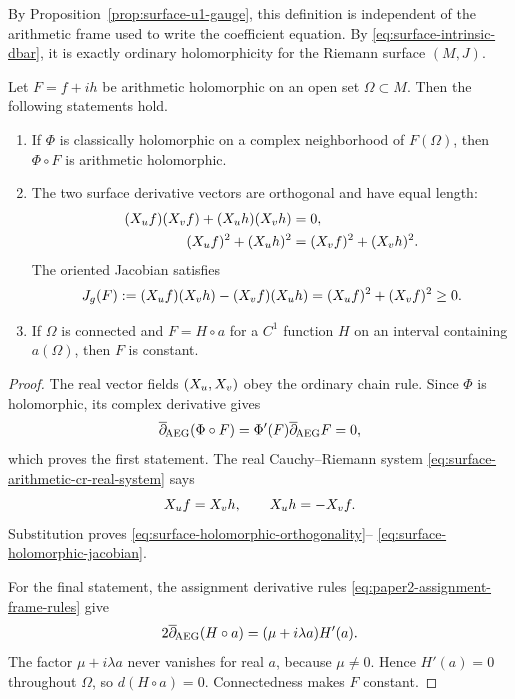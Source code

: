 By Proposition~\ref{prop:surface-u1-gauge}, this definition is independent of
the arithmetic frame used to write the coefficient equation.  By
\eqref{eq:surface-intrinsic-dbar}, it is exactly ordinary holomorphicity for the
Riemann surface $(M,J)$.

\begin{proposition}
\label{prop:surface-elementary-holomorphic-calculus}
Let $F=f+ih$ be arithmetic holomorphic on an open set $\Omega\subset M$.
Then the following statements hold.
\begin{enumerate}
 \item If $\Phi$ is classically holomorphic on a complex neighborhood of
 $F(\Omega)$, then $\Phi\circ F$ is arithmetic holomorphic.
 \item The two surface derivative vectors are orthogonal and have equal length:
 \begin{align}
  (X_u f)(X_v f)+(X_u h)(X_v h)&=0,
  \label{eq:surface-holomorphic-orthogonality}\\
  (X_u f)^2+(X_u h)^2
  &=(X_v f)^2+(X_v h)^2.
  \label{eq:surface-holomorphic-equal-length}
 \end{align}
 The oriented Jacobian satisfies
 \begin{equation}\label{eq:surface-holomorphic-jacobian}
  J_g(F)
  :=(X_u f)(X_v h)-(X_v f)(X_u h)
  =(X_u f)^2+(X_v f)^2\ge0.
 \end{equation}
 \item If $\Omega$ is connected and $F=H\circ a$ for a
 $C^1$ function $H$ on an interval containing $a(\Omega)$, then $F$
 is constant.
\end{enumerate}
\end{proposition}

\begin{proof}
The real vector fields $(X_u,X_v)$ obey the ordinary chain rule.  Since
$\Phi$ is holomorphic, its complex derivative gives
\[
 \overline\partial_{\!\mathrm{AEG}}(\Phi\circ F)
 =\Phi'(F)\overline\partial_{\!\mathrm{AEG}} F=0,
\]
which proves the first statement.  The real Cauchy--Riemann system
\eqref{eq:surface-arithmetic-cr-real-system} says
\[
 X_u f=X_v h,
 \qquad
 X_u h=-X_v f.
\]
Substitution proves
\eqref{eq:surface-holomorphic-orthogonality}--
\eqref{eq:surface-holomorphic-jacobian}.

For the final statement, the assignment derivative rules
\eqref{eq:paper2-assignment-frame-rules} give
\begin{equation}\label{eq:surface-a-only-holomorphic-rigidity}
 2\overline\partial_{\!\mathrm{AEG}}(H\circ a)
 =(\mu+i\lambda a)H'(a).
\end{equation}
The factor $\mu+i\lambda a$ never vanishes for real $a$, because
$\mu\ne0$.  Hence $H'(a)=0$ throughout $\Omega$, so
$d(H\circ a)=0$.  Connectedness makes $F$ constant.
\end{proof}

